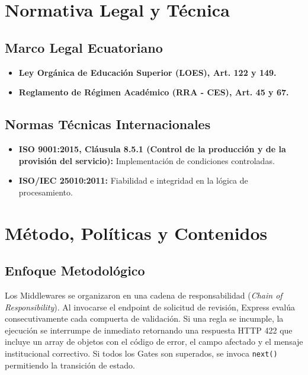\documentclass[12pt,a4paper]{article}
\begin{document}
\section{Normativa Legal y Técnica}
\subsection{Marco Legal Ecuatoriano}
\begin{itemize}[leftmargin=1.5em, itemsep=2pt]
    \item \textbf{Ley Orgánica de Educación Superior (LOES), Art. 122 y 149.}
    \item \textbf{Reglamento de Régimen Académico (RRA - CES), Art. 45 y 67.}
\end{itemize}
\subsection{Normas Técnicas Internacionales}
\begin{itemize}[leftmargin=1.5em, itemsep=2pt]
    \item \textbf{ISO 9001:2015, Cláusula 8.5.1 (Control de la producción y de la provisión del servicio):} Implementación de condiciones controladas.
    \item \textbf{ISO/IEC 25010:2011:} Fiabilidad e integridad en la lógica de procesamiento.
\end{itemize}

\section{Método, Políticas y Contenidos}
\subsection{Enfoque Metodológico}
Los Middlewares se organizaron en una cadena de responsabilidad (\textit{Chain of Responsibility}). Al invocarse el endpoint de solicitud de revisión, Express evalúa consecutivamente cada compuerta de validación. Si una regla se incumple, la ejecución se interrumpe de inmediato retornando una respuesta HTTP 422 que incluye un array de objetos con el código de error, el campo afectado y el mensaje institucional correctivo. Si todos los Gates son superados, se invoca \texttt{next()} permitiendo la transición de estado.
\end{document}
